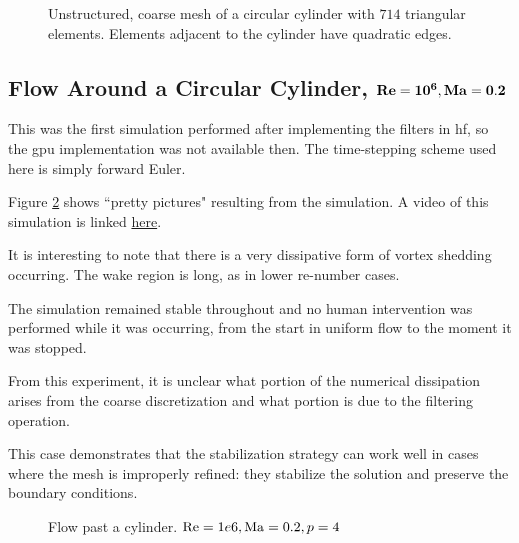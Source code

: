 \begin{figure*}
\hspace{-1cm}
\hfill
{}
\caption{Unstructured, coarse mesh of a circular cylinder with $714$ triangular elements. Elements adjacent to the cylinder have quadratic edges.}
\label{fig:meshes}

\end{figure*}

\subsection{Flow Around a Circular Cylinder, $\bf Re =  10^6, Ma = 0.2$}
This was the first simulation performed after implementing the filters in \gls{hf}, so the \gls{gpu} implementation was not available then. The time-stepping scheme used here is simply forward Euler.

Figure \ref{fig:Ma0.2Re1e6_Ma} shows ``pretty pictures" resulting from the simulation. A video of this simulation is linked \href{https://youtu.be/b6kx8-jrK6Q}{here}.

It is interesting to note that there is a very dissipative form of vortex shedding occurring. The wake region is long, as in lower \gls{re}-number cases.

The simulation remained stable throughout and no human intervention was performed while it was occurring, from the start in uniform flow to the moment it was stopped.

From this experiment, it is unclear what portion of the numerical dissipation arises from the coarse discretization and what portion is due to the filtering operation.

This case demonstrates that the stabilization strategy can work well in cases where the mesh is improperly refined: they stabilize the solution and preserve the boundary conditions.

\begin{figure*}
\hspace{-1cm}
\hfill
{}
\caption{Flow past a cylinder. $\mathrm{Re} = 1e6, \mathrm{Ma} = 0.2, p = 4$}
\label{fig:Ma0.2Re1e6_Ma}

\end{figure*}

